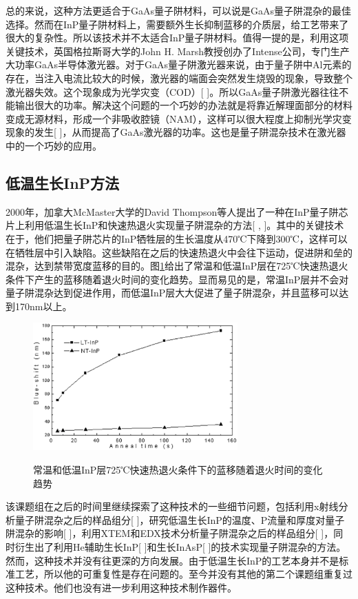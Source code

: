 \documentclass{ZJUthesis}
\begin{document}
总的来说，这种方法更适合于GaAs量子阱材料，可以说是GaAs量子阱混杂的最佳选择。然而在InP量子阱材料上，需要额外生长抑制蓝移的介质层，给工艺带来了很大的复杂性。所以该技术并不太适合InP量子阱材料。值得一提的是，利用这项关键技术，英国格拉斯哥大学的John H. Marsh教授创办了Intense公司，专门生产大功率GaAs半导体激光器。对于GaAs量子阱激光器来说，由于量子阱中Al元素的存在，当注入电流比较大的时候，激光器的端面会突然发生烧毁的现象，导致整个激光器失效。这个现象成为光学灾变（COD）[ ]。所以GaAs量子阱激光器往往不能输出很大的功率。解决这个问题的一个巧妙的办法就是将靠近解理面部分的材料变成无源材料，形成一个非吸收腔镜（NAM），这样可以很大程度上抑制光学灾变现象的发生[ ]，从而提高了GaAs激光器的功率。这也是量子阱混杂技术在激光器中的一个巧妙的应用。

\subsection{低温生长InP方法}

2000年，加拿大McMaster大学的David Thompson等人提出了一种在InP量子阱芯片上利用低温生长InP和快速热退火实现量子阱混杂的方法[ , ]。其中的关键技术在于，他们把量子阱芯片的InP牺牲层的生长温度从470℃下降到300℃，这样可以在牺牲层中引入缺陷。这些缺陷在之后的快速热退火中会往下运动，促进阱和垒的混杂，达到禁带宽度蓝移的目的。图\ref{fig_ltinp}给出了常温和低温InP层在725℃快速热退火条件下产生的蓝移随着退火时间的变化趋势。显而易见的是，常温InP层并不会对量子阱混杂达到促进作用，而低温InP层大大促进了量子阱混杂，并且蓝移可以达到170nm以上。

\begin{figure}[!ht]
  \centering
  \includegraphics[width=0.7\textwidth]{./Pictures/ltinp.eps}\\
  \caption{常温和低温InP层725℃快速热退火条件下的蓝移随着退火时间的变化趋势}
  \label{fig_ltinp}
\end{figure}

该课题组在之后的时间里继续探索了这种技术的一些细节问题，包括利用x射线分析量子阱混杂之后的样品组分[ ]，研究低温生长InP的温度、P流量和厚度对量子阱混杂的影响[ ]，利用XTEM和EDX技术分析量子阱混杂之后的样品组分[ ]，同时衍生出了利用He辅助生长InP[ ]和生长InAsP[ ]的技术实现量子阱混杂的方法。然而，这种技术并没有往更深的方向发展。由于低温生长InP的工艺本身并不是标准工艺，所以他的可重复性是存在问题的。至今并没有其他的第二个课题组重复过这种技术。他们也没有进一步利用这种技术制作器件。
\end{document}
